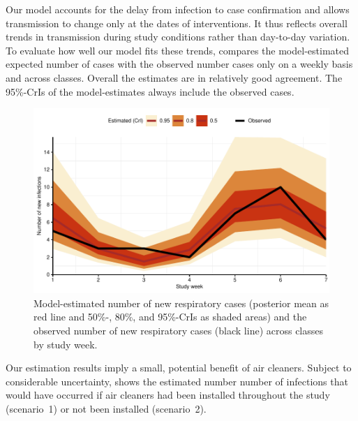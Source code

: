 \documentclass[fleqn,11pt]{wlscirep_supp}
\begin{document}
Our model accounts for the delay from infection to case confirmation and allows transmission to change only at the dates of interventions. It thus reflects overall trends in transmission during study conditions rather than day-to-day variation. To evaluate how well our model fits these trends,  compares the model-estimated expected number of cases  with the observed number cases only on a weekly basis and across classes. Overall the estimates are in relatively good agreement. The 95\%-CrIs of the model-estimates always include the observed cases. 

\begin{figure}[!htpb]
    \centering
    \includegraphics{../../results/epi-data/model-fit.pdf}
    \caption[Comparison of model-estimates with observed case data]{Model-estimated number of new respiratory cases (posterior mean as red line and 50\%-, 80\%, and 95\%-CrIs as shaded areas) and the observed number of new respiratory cases (black line) across classes by study week.}
    \label{fig:coverage}
\end{figure}

Our estimation results imply a small, potential benefit of air cleaners. Subject to considerable uncertainty,  shows the estimated number number of infections that would have occurred if air cleaners had been installed throughout the study (scenario~1) or not been installed (scenario~2). 
\end{document}
